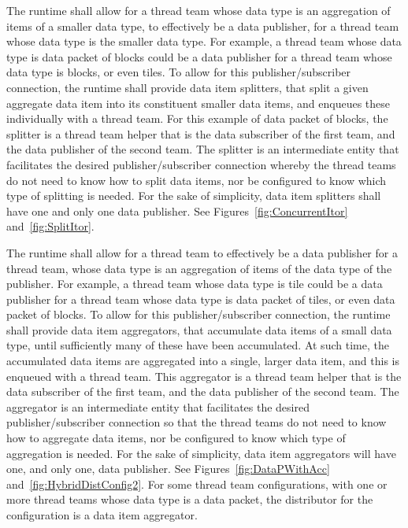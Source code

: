 \documentclass{article}
\begin{document}
\begin{req}
The runtime shall allow for a thread team whose data type is an aggregation of
items of a smaller data type, to effectively be a data publisher, for a thread
team whose data type is the smaller data type.  For example, a thread team whose
data type is data packet of blocks could be a data publisher for a thread team
whose data type is blocks, or even tiles.  To allow for this publisher/subscriber
connection, the runtime shall provide data item splitters, that split a given
aggregate data item into its constituent smaller data items, and enqueues these
individually with a thread team.  For this example of data packet of blocks,
 the splitter is a thread team
helper that is the data subscriber of the first team, and the data publisher of
the second team.  The splitter is an intermediate entity that
facilitates the desired publisher/subscriber connection whereby the
thread teams do not need to know how to split data items, nor be configured to know
which type of splitting is needed.  For the sake of simplicity, data item
splitters shall have one and only one data publisher.
See Figures~\ref{fig:ConcurrentItor}
and~\ref{fig:SplitItor}.
\end{req}

\begin{req}
The runtime shall allow for a thread team to effectively be a data publisher for
a thread team, whose data type is an aggregation of items of the data type of the
publisher.  For example, a thread team whose data type is tile could be a data
publisher for a thread team whose data type is data packet of tiles, or even data
packet of blocks.  To allow for this publisher/subscriber connection, the
runtime shall provide data item aggregators, that accumulate data items of a
small data type, until sufficiently many of these have been accumulated.  At such
time, the accumulated data items are aggregated into a single, larger data item,
and this is enqueued with a thread team.  This aggregator is a thread
team helper that is the data subscriber of the first team, and the data publisher
of the second team.  The aggregator is an intermediate entity that
facilitates the desired publisher/subscriber connection so that the
thread teams do not need to know how to aggregate data items, nor be configured
to know which type of aggregation is needed.  For the sake of simplicity, data
item aggregators will have one, and only one, data publisher.  See Figures~\ref{fig:DataPWithAcc}
and~\ref{fig:HybridDistConfig2}.  For some thread team configurations,
with one or more thread teams whose data type is a data packet, the distributor
for the configuration is a data item aggregator.
\end{req}
\end{document}
